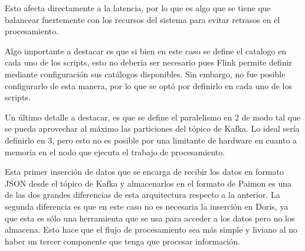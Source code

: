Esto afecta directamente a la latencia, por lo que es algo que se tiene que balancear fuertemente con 
los recursos del sistema para evitar retrasos en el procesamiento.\newline

\newpage

Algo importante a destacar es que si bien en este caso se define el catalogo en cada uno de los scripts, 
esto no debería ser necesario pues Flink permite definir mediante configuración sus catálogos disponibles.
Sin embargo, no fue posible configurarlo de esta manera, por lo que se optó por definirlo en cada uno de los scripts.\newline

Un último detalle a destacar, es que se define el paralelismo en 2 de modo tal que se pueda aprovechar al máximo 
las particiones del tópico de Kafka. Lo ideal sería definirlo en 3, 
pero esto no es posible por una limitante de hardware en cuanto a memoria en el nodo que ejecuta el trabajo de procesamiento.\newline

Esta primer inserción de datos que se encarga de recibir los datos en formato JSON desde el tópico de Kafka
y almacenarlos en el formato de Paimon es una de las dos grandes diferencias de esta arquitectura respecto a la anterior.
La segunda diferencia es que en este caso no es necesaria la inserción en Doris, ya que esta es sólo una herramienta que se usa para acceder a los datos pero no los almacena. 
Esto hace que el flujo de procesamiento sea más simple y liviano al no haber un tercer componente que tenga que procesar información. 